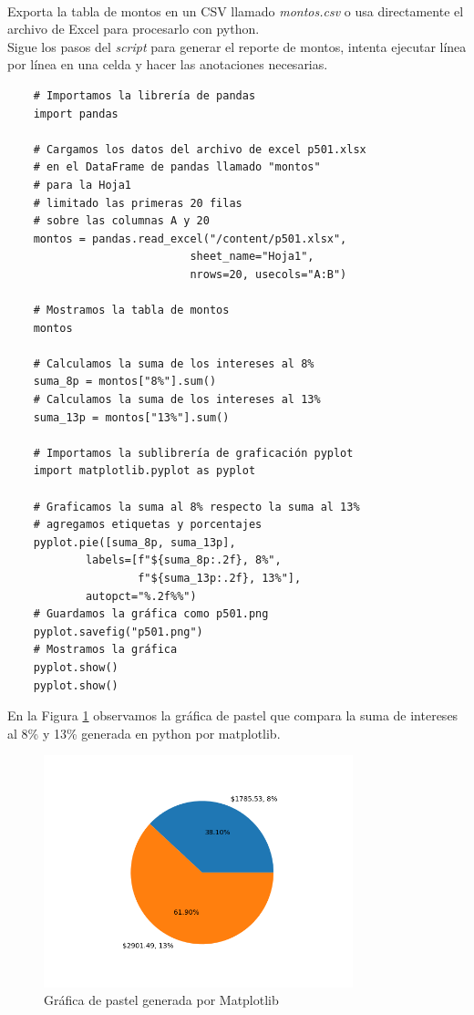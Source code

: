 \documentclass{article}
\begin{document}
\\[12pt]
Exporta la tabla de montos en un CSV llamado \textit{montos.csv} o usa directamente el archivo de Excel para procesarlo con python.
\\[12pt]
Sigue los pasos del \textit{script} para generar el reporte de montos, intenta ejecutar línea por línea en una celda y hacer las anotaciones necesarias.
\begin{verbatim}
    # Importamos la librería de pandas
    import pandas

    # Cargamos los datos del archivo de excel p501.xlsx
    # en el DataFrame de pandas llamado "montos"
    # para la Hoja1
    # limitado las primeras 20 filas
    # sobre las columnas A y 20
    montos = pandas.read_excel("/content/p501.xlsx", 
                            sheet_name="Hoja1", 
                            nrows=20, usecols="A:B")

    # Mostramos la tabla de montos
    montos

    # Calculamos la suma de los intereses al 8%
    suma_8p = montos["8%"].sum()
    # Calculamos la suma de los intereses al 13%
    suma_13p = montos["13%"].sum()

    # Importamos la sublibrería de graficación pyplot
    import matplotlib.pyplot as pyplot

    # Graficamos la suma al 8% respecto la suma al 13%
    # agregamos etiquetas y porcentajes
    pyplot.pie([suma_8p, suma_13p], 
            labels=[f"${suma_8p:.2f}, 8%", 
                    f"${suma_13p:.2f}, 13%"], 
            autopct="%.2f%%")
    # Guardamos la gráfica como p501.png
    pyplot.savefig("p501.png")
    # Mostramos la gráfica
    pyplot.show()
    pyplot.show()
\end{verbatim}
En la Figura \ref{fig:p501b} observamos la gráfica de pastel que compara la suma de intereses al 8\% y 13\% generada en python por matplotlib.
\begin{figure}[h]
    \centering
    \includegraphics[width=0.8\textwidth]{figures/p501b.png}
    \captionsetup{width=\textwidth}
    \caption{Gráfica de pastel generada por Matplotlib}
    \label{fig:p501b}
\end{figure}
\end{document}

